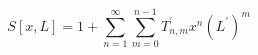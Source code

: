 \begin{equation}%
S[x,L] = 1 + \sum_{n=1}^\infty \sum_{m=0}^{n-1} T_{n, m}^\prime x^n (L^\prime)^m
\end{equation}

